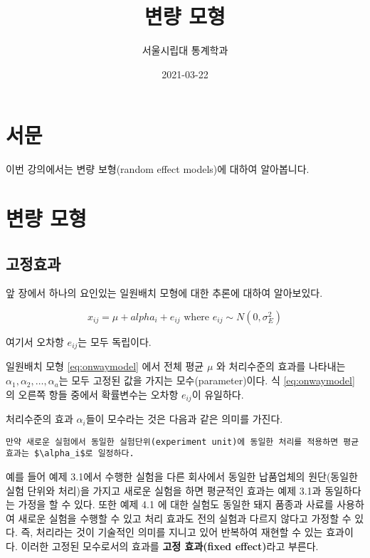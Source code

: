 \documentclass[
]{book}
\title{변량 모형}
\author{서울시립대 통계학과}
\date{2021-03-22}
\begin{document}
\maketitle

{
\setcounter{tocdepth}{1}
\tableofcontents
}
\hypertarget{uxc11cuxbb38}{%
\chapter*{서문}\label{uxc11cuxbb38}}


이번 강의에서는 변량 보형(random effect models)에 대하여 알아봅니다.

\hypertarget{intro}{%
\chapter{변량 모형}\label{intro}}

\hypertarget{uxace0uxc815uxd6a8uxacfc}{%
\section{고정효과}\label{uxace0uxc815uxd6a8uxacfc}}

앞 장에서 하나의 요인있는 일원배치 모형에 대한 추론에 대하여 알아보있다.

\begin{equation}
x_{ij} = \mu + alpha_i + e_{ij} \text{ where } e_{ij} \sim N(0,\sigma_E^2)
\label{eq:onewaymodel}
\end{equation}

여기서 오차항 \(e_{ij}\)는 모두 독립이다.

일원배치 모형 \eqref{eq:onwaymodel} 에서 전체 평균 \(\mu\) 와 처리수준의 효과를 나타내는 \(\alpha_1, \alpha_2, \dots, \alpha_a\)는 모두 고정된 값을 가지는 모수(parameter)이다. 식 \eqref{eq:onwaymodel} 의 오른쪽 항들 중에서 확률변수는 오차항 \(e_{ij}\)이 유일하다.

처리수준의 효과 \(\alpha_i\)들이 모수라는 것은 다음과 같은 의미를 가진다.

\begin{verbatim}
만약 새로운 실험에서 동일한 실험단위(experiment unit)에 동일한 처리를 적용하면 평균 효과는 $\alpha_i$로 일정하다.
\end{verbatim}

예를 들어 예제 3.1에서 수행한 실험을 다른 회사에서 동일한 납품업체의 원단(동일한 실험 단위와 처리)을 가지고 새로운 실험을 하면 평균적인 효과는 예제 3.1과 동일하다는 가정을 할 수 있다. 또한 예제 4.1 에 대한 실험도 동일한 돼지 품종과 사료를 사용하여 새로운 실험을 수행할 수 있고 처리 효과도 전의 실험과 다르지 않다고 가정할 수 있다. 즉, 처리라는 것이 기술적인 의미를 지니고 있어 반복하여 재현할 수 있는 효과이다. 이러한 고정된 모수로서의 효과를 \textbf{고정 효과(fixed effect)}라고 부른다.
\end{document}
